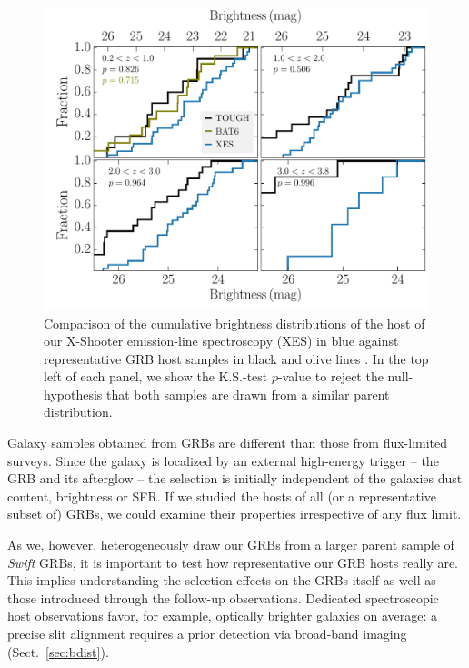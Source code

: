 \documentclass[traditabstract, longauth]{aa}
\begin{document}
\begin{figure}
\includegraphics[angle=0, width=0.99\columnwidth]{Figs/Bdist.pdf}
\caption{Comparison of the cumulative brightness distributions of the host of our X-Shooter emission-line spectroscopy (XES) in blue against representative GRB host samples in black and olive lines \citep{2012ApJ...756..187H, 2014arXiv1409.7064V}. In the top left of each panel, we show the K.S.-test $p$-value to reject the null-hypothesis that both samples are drawn from a similar parent distribution.}
\label{fig:selection}
\end{figure}

 {Galaxy samples obtained from GRBs are different than those from flux-limited surveys. Since the galaxy is localized by an external high-energy trigger -- the GRB and its afterglow -- the selection is initially independent of the galaxies dust content, brightness or SFR. If we studied the hosts of all (or a representative subset of) GRBs, we could examine their properties irrespective of any flux limit.}

 {As we, however, heterogeneously draw our GRBs from a larger parent sample of \textit{Swift} GRBs, it is important to test how representative our GRB hosts really are. This implies understanding the selection effects on the GRBs itself as well as those introduced through the follow-up observations. Dedicated spectroscopic host observations favor, for example, optically brighter galaxies on average: a precise slit alignment requires a prior detection via broad-band imaging (Sect.~\ref{sec:bdist}).}
\end{document}
